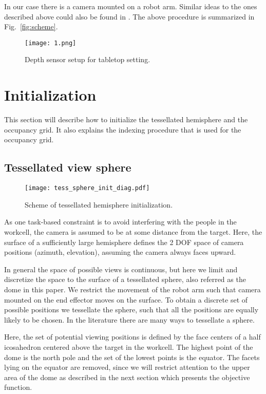 \documentclass[10pt,twocolumn,letterpaper]{article}
\begin{document}
In our case there is a camera mounted on a robot arm. Similar ideas to the ones described above could also be found in \cite{Hunt1982,Papanikolopoulos1993}. 
The above procedure is summarized in Fig.~\ref{fig:scheme}.

\begin{figure}
  \texttt{[image: 1.png]}
  \centering
  \caption{Depth sensor setup for tabletop setting.}
  \label{fig:setup}
\end{figure}


\section{Initialization}\label{sec:inits}
This section will describe how to initialize the tessellated hemisphere and the occupancy grid.
It also explains the indexing procedure that is used for the occupancy grid.

\subsection{Tessellated view sphere}\label{sec:tess}

\begin{figure}[b]
  \texttt{[image: tess\_sphere\_init\_diag.pdf]}
  \centering
  \caption{Scheme of tessellated hemisphere initialization.}
  \label{fig:tess-init}
\end{figure}

As one task-based constraint is to avoid interfering with the people in the workcell, the camera is assumed to be at some distance from the target. 
Here, the surface of a sufficiently large hemisphere defines the 2 DOF space of camera positions (azimuth, elevation), assuming the camera always faces upward.

In general the space of possible views is continuous, but here we limit and discretize the space to the surface of a tessellated sphere, also referred as the dome in this paper. 
We restrict the movement of the robot arm such that camera mounted on the end effector moves on the surface. 
To obtain a discrete set of possible positions we tessellate the sphere, such that all the positions are equally likely to be chosen. 
In the literature there are many ways to tessellate a sphere. 

Here, the set of potential viewing positions is defined by the face centers of a half icosahedron centered above the target in the workcell. 
The highest point of the dome is the north pole and the set of the lowest points is the equator. 
The facets lying on the equator are removed, since we will restrict attention to the upper area of the dome as described in the next section which presents the objective function. 
\end{document}
